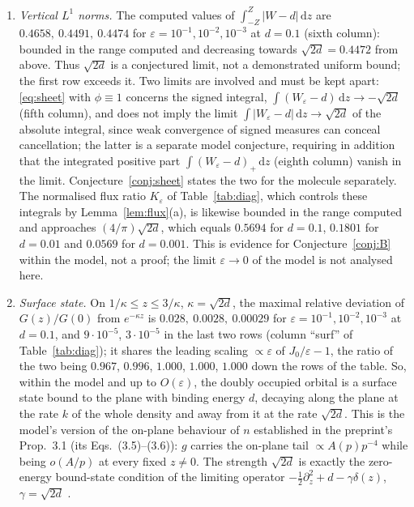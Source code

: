 \documentclass[11pt,a4paper]{article}
\theoremstyle{plain}
\theoremstyle{definition}
\theoremstyle{remark}
\newcommand{\dd}{\,\mathrm{d}}
\begin{document}
\begin{enumerate}
\item \emph{Vertical $L^1$ norms.} The computed values of $\int_{-Z}^{Z}|W-d|\dd z$ are $0.4658,\ 0.4491,\ 0.4474$ for $\varepsilon=10^{-1},10^{-2},10^{-3}$ at $d=0.1$ (sixth column): bounded in the range computed and decreasing towards $\sqrt{2d}=0.4472$ from above. Thus $\sqrt{2d}$ is a conjectured limit, not a demonstrated uniform bound; the first row exceeds it. Two limits are involved and must be kept apart: \eqref{eq:sheet} with $\phi\equiv1$ concerns the signed integral, $\int(W_\varepsilon-d)\dd z\to-\sqrt{2d}$ (fifth column), and does not imply the limit $\int|W_\varepsilon-d|\dd z\to\sqrt{2d}$ of the absolute integral, since weak convergence of signed measures can conceal cancellation; the latter is a separate model conjecture, requiring in addition that the integrated positive part $\int(W_\varepsilon-d)_+\dd z$ (eighth column) vanish in the limit. Conjecture~\ref{conj:sheet} states the two for the molecule separately. The normalised flux ratio $K_\varepsilon$ of Table~\ref{tab:diag}, which controls these integrals by Lemma~\ref{lem:flux}(a), is likewise bounded in the range computed and approaches $(4/\pi)\sqrt{2d}$, which equals $0.5694$ for $d=0.1$, $0.1801$ for $d=0.01$ and $0.0569$ for $d=0.001$. This is evidence for Conjecture~\ref{conj:B} within the model, not a proof; the limit $\varepsilon\to0$ of the model is not analysed here.
\item \emph{Surface state.} On $1/\kappa\le z\le3/\kappa$, $\kappa=\sqrt{2d}$, the maximal relative deviation of $G(z)/G(0)$ from $e^{-\kappa z}$ is $0.028,\ 0.0028,\ 0.00029$ for $\varepsilon=10^{-1},10^{-2},10^{-3}$ at $d=0.1$, and $9\cdot10^{-5}$, $3\cdot10^{-5}$ in the last two rows (column ``surf'' of Table~\ref{tab:diag}); it shares the leading scaling $\propto\varepsilon$ of $J_0/\varepsilon-1$, the ratio of the two being $0.967$, $0.996$, $1.000$, $1.000$, $1.000$ down the rows of the table. So, within the model and up to $O(\varepsilon)$, the doubly occupied orbital is a surface state bound to the plane with binding energy $d$, decaying along the plane at the rate $k$ of the whole density and away from it at the rate $\sqrt{2d}$. This is the model's version of the on-plane behaviour of $n$ established in the preprint's Prop.~3.1 (its Eqs.~(3.5)--(3.6)): $g$ carries the on-plane tail $\propto A(p)p^{-4}$ while being $o(A/p)$ at every fixed $z\ne0$. The strength $\sqrt{2d}$ is exactly the zero-energy bound-state condition of the limiting operator $-\tfrac12\partial_z^2+d-\gamma\delta(z)$, $\gamma=\sqrt{2d}$ \cite[Ch.~I.3]{AGHKH05}.

\end{enumerate}
\end{document}
